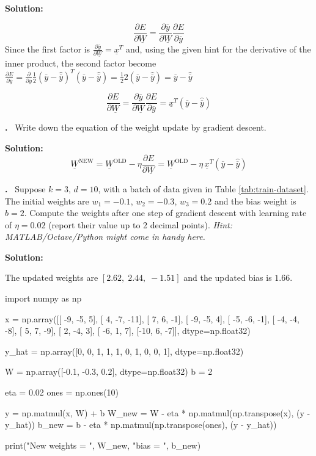 \documentclass[12pt]{article}
\newcounter{problem}
\newcounter{solution}
\newcommand\Problem{%
	\stepcounter{problem}%
	\textbf{\theproblem.}~%
	\setcounter{solution}{0}%
}
\newcommand\Solution{%
	\textbf{Solution:}\\%
}
\begin{document}
\Solution{	
	\begin{equation}
	 \frac{\partial E}{\partial \underline{W}}= \frac{\partial \overline{y}}{\partial \underline{W}}\frac{\partial E}{\partial \overline{y}}
	\end{equation}
	Since the first factor is $\frac{\partial \overline{y}}{\partial \underline{W}}=\underline{x}^T$ and, using the given hint for the derivative of the inner product, the second factor become $\frac{\partial E}{\partial \overline{y}} = \frac{\partial }{\partial \overline{y}} \frac{1}{2}(\overline{y}-\hat{\overline{y}})^T(\overline{y}-\hat{\overline{y}}) = \frac{1}{2}2(\overline{y}-\hat{\overline{y}})=\overline{y}-\hat{\overline{y}}$
	
	 
	\begin{equation}
		 \frac{\partial E}{\partial \underline{W}}= \frac{\partial \overline{y}}{\partial \underline{W}}\frac{\partial E}{\partial \overline{y}} = \underline{x}^T(\overline{y}-\hat{\overline{y}})
	\end{equation}
}

\Problem{Write down the equation of the weight update by gradient descent.}

\Solution{	
	\begin{equation}
	\underline{W}^{\mathrm{NEW}}=\underline{W}^{\mathrm{OLD}}-\eta \frac{\partial E}{\partial \underline{W}}=\underline{W}^{\mathrm{OLD}}-\eta \, \underline{x}^T(\overline{y}-\hat{\overline{y}})
	\end{equation}
}

\Problem{Suppose $k = 3\mbox{, }d =10$, with a batch of data given in Table \ref{tab:train-dataset}. The initial weights are $w_1 = -0.1$, $w_2 = -0.3$, $w_3 = 0.2$ and the bias weight is $b = 2$. Compute the weights after one step of gradient descent with learning rate of $\eta = 0.02$ (report their value up to 2 decimal points). \textit{Hint: MATLAB/Octave/Python might come in handy here.}}

\Solution{
	The updated weights are $[2.62, \; 2.44, \; -1.51]$ and the updated bias is $1.66$.
	
	\begin{python}
	import numpy as np
				
	x = np.array([[ -9, -5,    5],
				   [   4, -7, -11],
				   [   7,   6,  -1],
				   [ -9, -5,    4],
				   [ -5, -6,  -1],
				   [ -4, -4,  -8],
				   [   5,   7,  -9],
				   [   2, -4,    3],
				   [ -6,   1,    7],
				   [-10,   6,  -7]], dtype=np.float32)
	
	y_hat = np.array([0, 0, 1, 1, 1, 0, 1, 0, 0, 1], dtype=np.float32)
	
	W = np.array([-0.1, -0.3, 0.2], dtype=np.float32)
	b = 2
	
	eta = 0.02
	ones = np.ones(10)
	
	y = np.matmul(x, W) + b
	W_new = W - eta * np.matmul(np.transpose(x), (y - y_hat))
	b_new = b - eta * np.matmul(np.transpose(ones), (y - y_hat))
	
	print("New weights = ", W_new, "\nNew bias = ", b_new)
	\end{python}
	
	}
\end{document}
